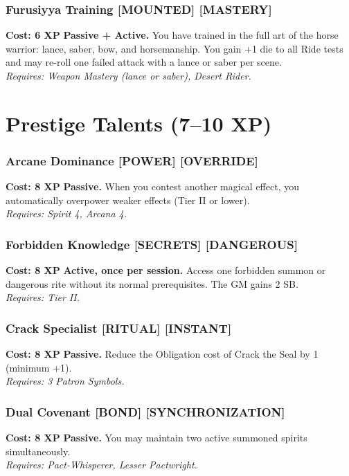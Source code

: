 \documentclass[12pt,a4paper]{book}
\begin{document}
\subsubsection*{Furusiyya Training \textnormal{[MOUNTED] [MASTERY]}}
\label{talent:furusiyya-training}
\textbf{Cost: 6 XP} \textbf{Passive + Active.} You have trained in the full art of the horse warrior: lance, saber, bow, and horsemanship. You gain +1 die to all Ride tests and may re-roll one failed attack with a lance or saber per scene. \\
\textit{Requires: Weapon Mastery (lance or saber), Desert Rider.}

\section{Prestige Talents (7--10 XP)}
\label{sec:prestige-talents}

\subsubsection*{Arcane Dominance \textnormal{[POWER] [OVERRIDE]}}
\label{talent:arcane-dominance}
\textbf{Cost: 8 XP} \textbf{Passive.} When you contest another magical effect, you automatically overpower weaker effects (Tier II or lower). \\
\textit{Requires: Spirit 4, Arcana 4.}

\subsubsection*{Forbidden Knowledge \textnormal{[SECRETS] [DANGEROUS]}}
\label{talent:forbidden-knowledge}
\textbf{Cost: 8 XP} \textbf{Active, once per session.} Access one forbidden summon or dangerous rite without its normal prerequisites. The GM gains 2 SB. \\
\textit{Requires: Tier II.}

\subsubsection*{Crack Specialist \textnormal{[RITUAL] [INSTANT]}}
\label{talent:crack-specialist}
\textbf{Cost: 8 XP} \textbf{Passive.} Reduce the Obligation cost of Crack the Seal by 1 (minimum +1). \\
\textit{Requires: 3 Patron Symbols.}

\subsubsection*{Dual Covenant \textnormal{[BOND] [SYNCHRONIZATION]}}
\label{talent:dual-covenant}
\textbf{Cost: 8 XP} \textbf{Passive.} You may maintain two active summoned spirits simultaneously. \\
\textit{Requires: Pact-Whisperer, Lesser Pactwright.}
\end{document}

